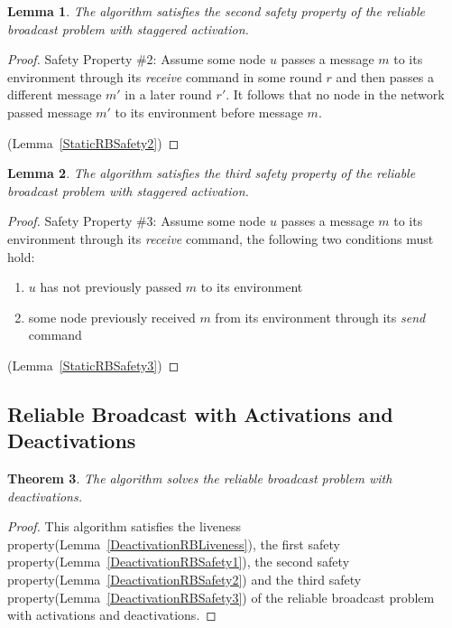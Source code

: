 \documentclass[english]{article}
\newtheorem{theorem}{Theorem}[section]
\newtheorem{lemma}[theorem]{Lemma}
\begin{document}
\begin{lemma}
\label{StaggeredRBSafety2}
The algorithm satisfies the second safety property of the reliable broadcast problem with staggered activation.
\end{lemma}
\begin{proof}
Safety Property \#2: Assume some node $u$ passes a message $m$ to its environment through its \textit{receive} command in some round $r$ and then passes a different message $m'$ in a later round $r'$. It follows that no node in the network passed message $m'$ to its environment before message $m$. 

(Lemma~\ref{StaticRBSafety2})

\end{proof}

\begin{lemma}
\label{StaggeredRBSafety3}
The algorithm satisfies the third safety property of the reliable broadcast problem with staggered activation.
\end{lemma}
\begin{proof}
Safety Property \#3: Assume some node $u$ passes a message $m$ to its environment through its \textit{receive} command, the following two conditions must hold:
  \begin {enumerate}
    \item $u$ has not previously passed $m$ to its environment
    \item some node previously received $m$ from its environment through its \textit{send} command
  \end{enumerate}

(Lemma~\ref{StaticRBSafety3})
\end{proof}



\subsection {Reliable Broadcast with Activations and Deactivations}

\begin{theorem}
\label{DeactivationReliableBroadcast}
The algorithm solves the reliable broadcast problem with deactivations.
\end{theorem}
\begin{proof}
This algorithm satisfies the liveness property(Lemma~\ref{DeactivationRBLiveness}), 
the first safety property(Lemma~\ref{DeactivationRBSafety1}),
the second safety property(Lemma~\ref{DeactivationRBSafety2}) and 
the third safety property(Lemma~\ref{DeactivationRBSafety3}) of the reliable broadcast problem with activations and deactivations.
\end{proof}
\end{document}
